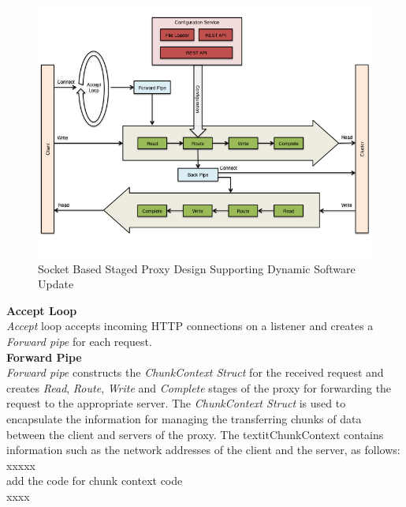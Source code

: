 \documentclass[a4paper,11pt,twoside]{article}
\begin{document}
\begin{figure}[!ht]
  \centering
     \includegraphics[scale=0.60]{proxy}
  \caption{Socket Based Staged Proxy Design Supporting Dynamic Software Update}
  \label{proxy}
\end{figure}

\noindent
\textbf{Accept Loop} \\
 \textit{Accept} loop accepts incoming HTTP connections on a listener and creates a  \textit{Forward pipe} for each request.\\  

\noindent
\textbf{Forward Pipe} \\
\textit{Forward pipe} constructs the \textit{ChunkContext Struct} for the received request and creates \textit{Read}, \textit{Route}, \textit{Write} and \textit{Complete} stages of the proxy for forwarding the request to the appropriate server. The \textit{ChunkContext Struct} is used to encapsulate the information for managing the transferring chunks of data between the client and servers of the proxy. The textit{ChunkContext} contains information such as the network addresses of the client and the server, as follows: \\ 

xxxxx \\
add the code for chunk context code \\
xxxx \\
\end{document}
